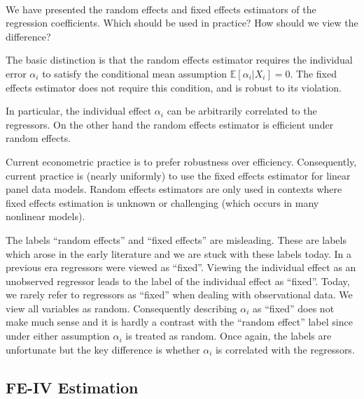 \begin{remark}
    \

    We have presented the random effects and fixed effects estimators of the regression coefficients.
Which should be used in practice? How should we view the difference?

    The basic distinction is that the random effects estimator requires the individual error $\alpha_i$ 
    to satisfy the conditional mean assumption $\mathbb{E}[\alpha_i | X_i] = 0$.
    The fixed effects estimator does not require this condition, and is robust to its violation. 
    
    In particular, the individual effect $\alpha_i$ can be arbitrarily correlated to the regressors.
    On the other hand the random effects estimator is efficient under random effects.

    Current econometric practice is to prefer robustness over efficiency. 
    Consequently, current practice is (nearly uniformly) to use the fixed effects estimator for linear panel data models. 
    Random effects estimators are only used in contexts where fixed effects estimation is unknown or challenging 
    (which occurs in many nonlinear models).
    
    The labels ``random effects'' and ``fixed effects'' are misleading. 
    These are labels which arose in the early literature and we are stuck with these labels today. 
    In a previous era regressors were viewed as ``fixed''. 
    Viewing the individual effect as an unobserved regressor leads to the label of the individual effect as ``fixed''. 
    Today, we rarely refer to regressors as ``fixed'' when dealing with observational data. 
    We view all variables as random. Consequently describing $\alpha_i$ as ``fixed'' does not make much sense 
    and it is hardly a contrast with the ``random effect'' label since under either assumption $\alpha_i$ is treated as random. 
    Once again, the labels are unfortunate but the key difference is whether $\alpha_i$ is correlated with the regressors.
\end{remark}

\subsection{FE-IV Estimation}

